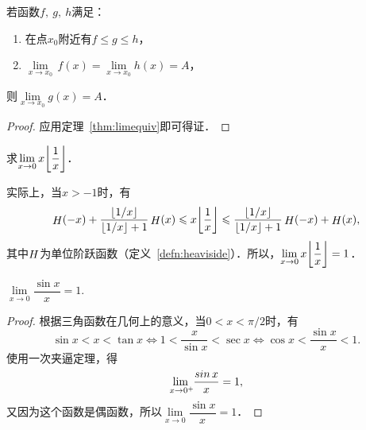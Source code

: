 \begin{theorem}[函数极限的夹逼定理]
  \label{thm:funcsqueeze}
  若函数\(f,\ g,\ h\)满足：
  \begin{enumerate}[topsep=0ex,itemsep=0ex]
    \renewcommand{\labelenumi}{\enumparen{\arabic{enumi}}}
  \item 在点\(x_0\)附近有\(f \le g \le h\)，
  \item \(\lim\limits_{x \to x_0} \,f(x) = \lim\limits_{x \to x_0} h(x) = A\)，
  \end{enumerate}
  则\(\lim\limits_{x \to x_0} g(x) = A\)．

  \begin{proof}
    应用定理~\ref{thm:limequiv}即可得证．
  \end{proof}
\end{theorem}

\begin{example*}
  求\(\lim\limits_{x\to0} x \floor[\bigg]{\dfrac1x}\)．

  \begin{remark}
    实际上，当\(x > -1\)时，有
    \begin{equation*}
      \Fn H(-x) + \frac{\floor{1/x}}{\floor{1/x}+1} \Fn H(x)
      \le
      x \floor[\bigg]{\dfrac1x}
      \le
      \frac{\floor{1/x}}{\floor{1/x}+1} \Fn H(-x) + \Fn H(x),
    \end{equation*}
    其中\(\Fn H\)为单位阶跃函数（定义~\ref{defn:heaviside}）．所以，\(\lim\limits_{x\to0} x \floor[\bigg]{\dfrac1x} = 1\)．
  \end{remark}
\end{example*}

\begin{theorem*}
  \(\lim\limits_{x\to0} \dfrac{\sin x}{x} = 1\).

  \begin{proof}
    根据三角函数在几何上的意义，当\(0 < x < \pi/2\)时，有
    \begin{equation*}
      \sin x < x < \tan x
      \iff
      1 < \frac{x}{\sin x} < \sec x
      \iff
      \cos x < \frac{\sin x}{x} < 1.
    \end{equation*}
    使用一次夹逼定理，得
    \begin{equation*}
      \lim_{x\to0^+\negthickspace} \frac{\sin x}{x} = 1,
    \end{equation*}
    又因为这个函数是偶函数，所以\(\lim\limits_{x\to0} \dfrac{\sin x}{x} = 1\)．
  \end{proof}
\end{theorem*}

